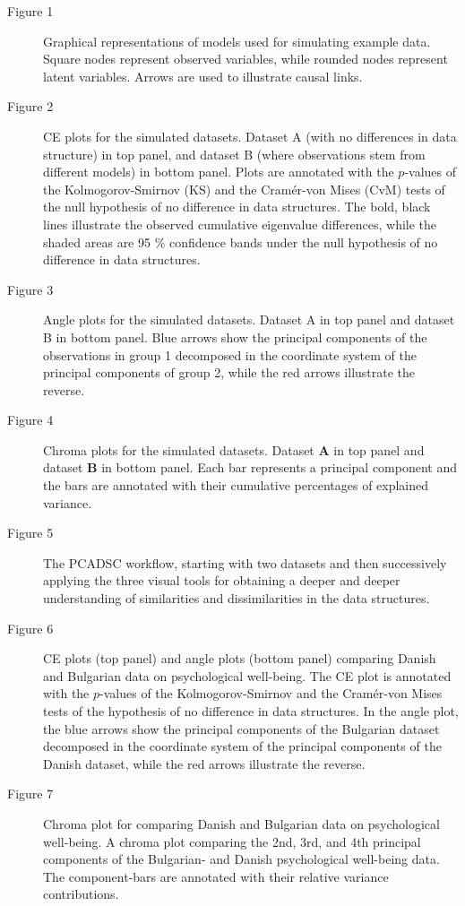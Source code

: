 \documentclass[]{interact}
\theoremstyle{plain}%
\theoremstyle{definition}
\theoremstyle{remark}
\begin{document}
\newpage

\begin{description}
\item[Figure 1] Graphical representations of models used for simulating example data. Square nodes represent observed variables, while rounded nodes represent latent variables. Arrows are used to illustrate causal links.
\item[Figure 2] CE plots for the simulated datasets. Dataset A (with no differences in data structure) in top panel, and dataset B (where observations stem from different models) in bottom panel. Plots are annotated with the $p$-values of the Kolmogorov-Smirnov (KS) and the Cram\'er-von Mises (CvM) tests of the null hypothesis of no difference in data structures. The bold, black lines illustrate the observed cumulative eigenvalue differences, while the shaded areas are 95 \% confidence bands under the null hypothesis of no difference in data structures.
\item[Figure 3] Angle plots for the simulated datasets. Dataset A in top panel and dataset B in bottom panel. Blue arrows show the principal components of the observations in group 1 decomposed in the coordinate system of the principal components of group 2, while the red arrows illustrate the reverse.
\item[Figure 4] Chroma plots for the simulated datasets. Dataset $\mathbf{A}$ in top panel and dataset $\mathbf{B}$ in bottom panel. Each bar represents a principal component and the bars are annotated with their cumulative percentages of explained variance.
\item[Figure 5] The PCADSC workflow, starting with two datasets and then successively applying the three visual tools for obtaining a deeper and deeper understanding of similarities and dissimilarities in the data structures.
\item[Figure 6] CE plots (top panel) and angle plots (bottom panel) comparing Danish and Bulgarian data on psychological well-being. The CE plot is annotated with the $p$-values of the Kolmogorov-Smirnov and the Cram\'er-von Mises tests of the hypothesis of no difference in data structures. In the angle plot, the blue arrows show the principal components of the Bulgarian dataset decomposed in the coordinate system of the principal components of the Danish dataset, while the red arrows illustrate the reverse.
\item[Figure 7] Chroma plot for comparing Danish and Bulgarian data on psychological well-being. A chroma plot comparing the 2nd, 3rd, and 4th principal components of the Bulgarian- and Danish psychological well-being data. The component-bars are annotated with their relative variance contributions.

\end{description}
\end{document}
